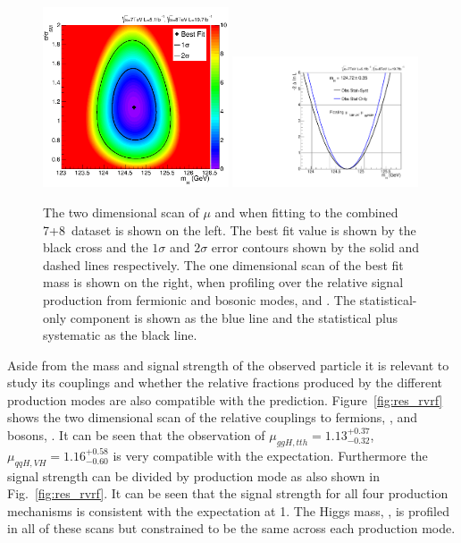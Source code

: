 \begin{figure}
  \includegraphics[width=0.49\textwidth]{results/plots/mva_mumh_scan.png}
  \includegraphics[width=0.49\textwidth]{results/plots/mva_mh_scan.pdf}
  \caption[2D \NLL scans of $\mu$ and \mH]{The two dimensional \NLL scan of $\mu$ and \mH when fitting to the combined 7+8~\TeV dataset is shown on the left. The best fit value is shown by the black cross and the $1\sigma$ and $2\sigma$ error contours shown by the solid and dashed lines respectively. The one dimensional \NLL scan of the best fit mass \mH is shown on the right, when profiling over the relative signal production from fermionic and bosonic modes, \RF and \RV. The statistical-only component is shown as the blue line and the statistical plus systematic as the black line.}
  \label{fig:res_mumh2}
\end{figure}

Aside from the mass and signal strength of the observed particle it is relevant to study its couplings and whether the relative fractions produced by the different production modes are also compatible with the \SM prediction. Figure~\ref{fig:res_rvrf} shows the two dimensional \NLL scan of the relative couplings to fermions, \RF, and bosons, \RV. It can be seen that the observation of $\mu_{ggH,tth}=1.13^{+0.37}_{-0.32}$, $\mu_{qqH,VH}=1.16^{+0.58}_{-0.60}$ is very compatible with the \SM expectation. Furthermore the signal strength can be divided by production mode as also shown in Fig.~\ref{fig:res_rvrf}. It can be seen that the signal strength for all four production mechanisms is consistent with the \SM expectation at 1. The Higgs mass, \mH, is profiled in all of these scans but constrained to be the same across each production mode.

